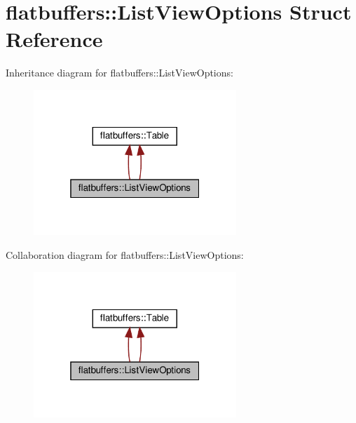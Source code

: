 \hypertarget{structflatbuffers_1_1ListViewOptions}{}\section{flatbuffers\+:\+:List\+View\+Options Struct Reference}
\label{structflatbuffers_1_1ListViewOptions}


Inheritance diagram for flatbuffers\+:\+:List\+View\+Options\+:
\nopagebreak
\begin{figure}[H]
\begin{center}
\leavevmode
\includegraphics[width=217pt]{structflatbuffers_1_1ListViewOptions__inherit__graph}
\end{center}
\end{figure}


Collaboration diagram for flatbuffers\+:\+:List\+View\+Options\+:
\nopagebreak
\begin{figure}[H]
\begin{center}
\leavevmode
\includegraphics[width=217pt]{structflatbuffers_1_1ListViewOptions__coll__graph}
\end{center}
\end{figure}
